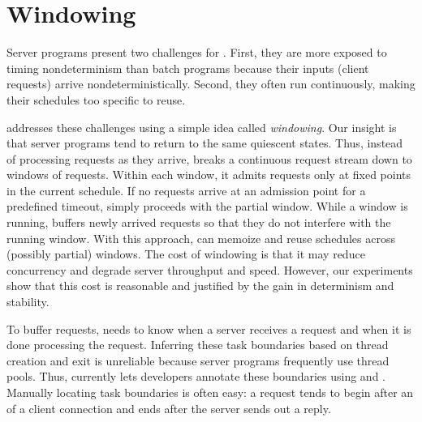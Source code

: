 \vspace{.1in}
\section{Windowing} \label{sec:tern-window}

Server programs present two challenges for \tern.  First, they 
are more exposed to
timing nondeterminism than batch programs because their inputs
(client requests) arrive nondeterministically.  Second, they often run
continuously, making their schedules too specific to reuse.


\tern addresses these challenges using a simple idea called
\emph{windowing}.  Our insight is that server programs tend to return to the
same quiescent states.  Thus, instead of processing requests as they
arrive, \tern breaks a continuous request stream down to windows of
requests.  Within each window, it admits requests only at fixed points in
the current schedule.  If no requests arrive at an admission point for a
predefined timeout, \tern simply proceeds with the partial window.  While a
window is running, \tern buffers newly arrived requests so that they do not
interfere with the running window.  With this approach, \tern can memoize
and reuse schedules across (possibly partial) windows.
The cost of windowing is that it may reduce concurrency
and degrade server throughput and speed.  However, our experiments show
that this cost is reasonable and justified by the gain in determinism
and stability.

To buffer requests, \tern needs to know when a server receives a request
and when it is done processing the request.  Inferring these task
boundaries based on thread creation and exit is unreliable because server
programs frequently use thread pools.  Thus, \tern currently lets
developers annotate these boundaries using  and
.  Manually locating task boundaries is often easy: a
request tends to begin after an  of a client connection and ends
after the server sends out a reply.

